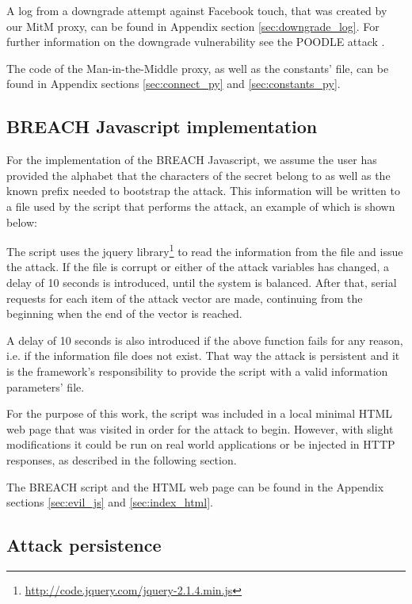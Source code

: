 A log from a downgrade attempt against Facebook touch, that was created by our
MitM proxy, can be found in Appendix section \ref{sec:downgrade_log}. For
further information on the downgrade vulnerability see the POODLE attack
\cite{poodle}.

The code of the Man-in-the-Middle proxy, as well as the constants' file, can
be found in Appendix sections \ref{sec:connect_py} and \ref{sec:constants_py}.

\subsection{BREACH Javascript implementation}

For the implementation of the BREACH Javascript, we assume the user has provided
the alphabet that the characters of the secret belong to as well as the known
prefix needed to bootstrap the attack. This information will be written to a
file used by the script that performs the attack, an example of which is shown
below:


The script uses the jquery
library\footnote{\url{http://code.jquery.com/jquery-2.1.4.min.js}} to read the
information from the file and issue the attack. If the file is corrupt or either
of the attack variables has changed, a delay of 10 seconds is introduced, until
the system is balanced. After that, serial requests for each item of the attack
vector are made, continuing from the beginning when the end of the vector is
reached.

A delay of 10 seconds is also introduced if the above function fails for any
reason, i.e. if the information file does not exist. That way the attack is
persistent and it is the framework's responsibility to provide the script with a
valid information parameters' file.

For the purpose of this work, the script was included in a local minimal HTML
web page that was visited in order for the attack to begin. However, with slight
modifications it could be run on real world applications or be injected in HTTP
responses, as described in the following section.

The BREACH script and the HTML web page can be found in the Appendix sections
\ref{sec:evil_js} and \ref{sec:index_html}.

\subsection{Attack persistence}\label{sec:persistence}

